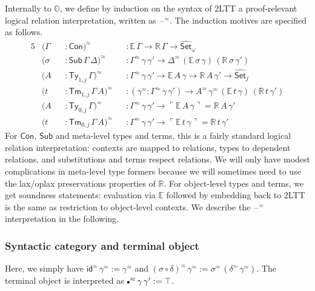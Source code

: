 \documentclass[acmsmall,anonymous,review]{acmart}
\newcommand{\msf}[1]{\mathsf{#1}}
\newcommand{\mbb}[1]{\mathbb{#1}}
\newcommand{\wh}[1]{\widehat{#1}}
\newcommand{\mbbo}{\mbb{O}}
\newcommand{\Con}{\msf{Con}}
\newcommand{\Sub}{\msf{Sub}}
\newcommand{\Ty}{\msf{Ty}}
\newcommand{\Tm}{\msf{Tm}}
\newcommand{\emptycon}{\scaleobj{.75}\bullet}
\newcommand{\id}{\msf{id}}
\newcommand{\Set}{\mathsf{Set}}
\newcommand{\blank}{{\mathord{\hspace{1pt}\text{--}\hspace{1pt}}}}
\newcommand{\emb}[1]{\ulcorner#1\urcorner}
\newcommand{\hato}{\bm\hat{\mbbo}}
\newcommand{\ev}{\mbb{E}}
\newcommand{\re}{\mbb{R}}
\theoremstyle{remark}
\newcommand{\whset}{\wh{\Set}}
\newcommand{\rel}{^{\approx}}
\begin{document}
Internally to $\hato$, we define by induction on the syntax of 2LTT a
proof-relevant logical relation interpretation, written as $\blank^{\approx}$. The induction
motives are specified as follows.
\begin{alignat*}{5}
  &(\Gamma &&: \Con)\rel && : \ev\,\Gamma \to \re\,\Gamma \to \whset_\omega\\
  &(\sigma &&: \Sub\,\Gamma\,\Delta)\rel &&: \Gamma\rel\,\gamma\,\gamma' \to \Delta\rel\,(\ev\,\sigma\,\gamma)\,(\re\,\sigma\,\gamma')\\
  &(A      &&: \Ty_{1,j}\,\Gamma)\rel &&: \Gamma\rel\,\gamma\,\gamma' \to \ev\,A\,\gamma \to \re\,A\,\gamma' \to \whset_j\\
  &(t      &&: \Tm_{1,j}\,\Gamma\,A)\rel &&: (\gamma\rel : \Gamma\rel\,\gamma\,\gamma') \to A\rel\,\gamma\rel\,(\ev\,t\,\gamma)\,(\re\,t\,\gamma')\\
  &(A      &&: \Ty_{0,j}\,\Gamma)\rel &&: \Gamma\rel\,\gamma\,\gamma' \to \emb{\ev\,A\,\gamma} = \re\,A\,\gamma' \\
  &(t      &&: \Tm_{0,j}\,\Gamma\,A)\rel &&: \Gamma\rel\,\gamma\,\gamma' \to \emb{\ev\,t\,\gamma} = \re\,t\,\gamma'
\end{alignat*}
For $\Con$, $\Sub$ and meta-level types and terms, this is a fairly standard
logical relation interpretation: contexts are mapped to relations, types to
dependent relations, and substitutions and terms respect relations. We will only have
modest complications in meta-level type formers because we will sometimes need to use
the lax/oplax preservations properties of $\re$. For object-level types and
terms, we get soundness statements: evaluation via $\ev$ followed by embedding
back to 2LTT is the same as restriction to object-level contexts. We describe
the $\blank\rel$ interpretation in the following.

\subsubsection{Syntactic category and terminal object}
Here, we simply have $\id\rel\,\gamma\rel := \gamma\rel$ and $(\sigma \circ
\delta)\rel\,\gamma\rel := \sigma\rel\,(\delta\rel\,\gamma\rel)$. The terminal
object is interpreted as $\emptycon\rel\,\gamma\,\gamma' := \top$.
\end{document}
